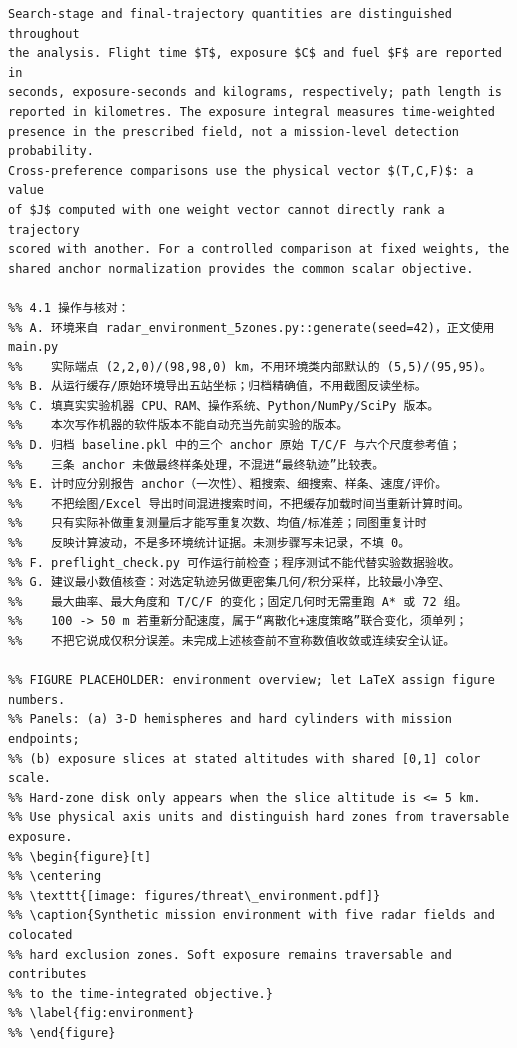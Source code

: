 \documentclass[12pt]{article}
\begin{document}
\begin{verbatim}
Search-stage and final-trajectory quantities are distinguished throughout
the analysis. Flight time $T$, exposure $C$ and fuel $F$ are reported in
seconds, exposure-seconds and kilograms, respectively; path length is
reported in kilometres. The exposure integral measures time-weighted
presence in the prescribed field, not a mission-level detection probability.
Cross-preference comparisons use the physical vector $(T,C,F)$: a value
of $J$ computed with one weight vector cannot directly rank a trajectory
scored with another. For a controlled comparison at fixed weights, the
shared anchor normalization provides the common scalar objective.

%% 4.1 操作与核对：
%% A. 环境来自 radar_environment_5zones.py::generate(seed=42)，正文使用 main.py
%%    实际端点 (2,2,0)/(98,98,0) km，不用环境类内部默认的 (5,5)/(95,95)。
%% B. 从运行缓存/原始环境导出五站坐标；归档精确值，不用截图反读坐标。
%% C. 填真实实验机器 CPU、RAM、操作系统、Python/NumPy/SciPy 版本。
%%    本次写作机器的软件版本不能自动充当先前实验的版本。
%% D. 归档 baseline.pkl 中的三个 anchor 原始 T/C/F 与六个尺度参考值；
%%    三条 anchor 未做最终样条处理，不混进“最终轨迹”比较表。
%% E. 计时应分别报告 anchor（一次性）、粗搜索、细搜索、样条、速度/评价。
%%    不把绘图/Excel 导出时间混进搜索时间，不把缓存加载时间当重新计算时间。
%%    只有实际补做重复测量后才能写重复次数、均值/标准差；同图重复计时
%%    反映计算波动，不是多环境统计证据。未测步骤写未记录，不填 0。
%% F. preflight_check.py 可作运行前检查；程序测试不能代替实验数据验收。
%% G. 建议最小数值核查：对选定轨迹另做更密集几何/积分采样，比较最小净空、
%%    最大曲率、最大角度和 T/C/F 的变化；固定几何时无需重跑 A* 或 72 组。
%%    100 -> 50 m 若重新分配速度，属于“离散化+速度策略”联合变化，须单列；
%%    不把它说成仅积分误差。未完成上述核查前不宣称数值收敛或连续安全认证。

%% FIGURE PLACEHOLDER: environment overview; let LaTeX assign figure numbers.
%% Panels: (a) 3-D hemispheres and hard cylinders with mission endpoints;
%% (b) exposure slices at stated altitudes with shared [0,1] color scale.
%% Hard-zone disk only appears when the slice altitude is <= 5 km.
%% Use physical axis units and distinguish hard zones from traversable exposure.
%% \begin{figure}[t]
%% \centering
%% \texttt{[image: figures/threat\_environment.pdf]}
%% \caption{Synthetic mission environment with five radar fields and colocated
%% hard exclusion zones. Soft exposure remains traversable and contributes
%% to the time-integrated objective.}
%% \label{fig:environment}
%% \end{figure}


\end{verbatim}
\end{document}
